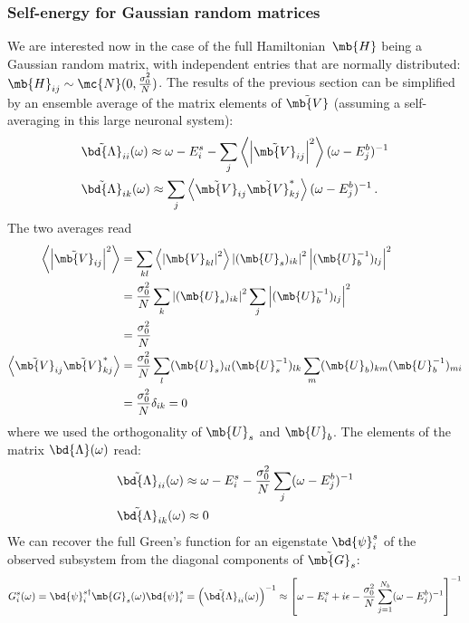 \subsubsection*{Self-energy for Gaussian random matrices}
We are interested now in the case of the full Hamiltonian~$\mb{H}$ being a Gaussian random matrix, with independent entries that are normally distributed: $\mb{H}_{ij}\sim\mc{N}(0, \frac{\sigma_0^2}{N})$.
The results of the previous section can be simplified by an ensemble average of the matrix elements of $\Tilde{\mb{V}}$ (assuming a self-averaging in this large neuronal system):
\begin{align}
    &\Tilde{\bd{\Lambda}}_{ii} (\omega) \approx
    \omega - E^s_i - \sum_j \left< \left| \Tilde{\mb{V}}_{ij} \right|^2 \right> (\omega-E^b_j)^{-1}
    \\
    &
    \Tilde{\bd{\Lambda}}_{ik} (\omega) \approx
    \sum_j \left< \Tilde{\mb{V}}_{ij} \Tilde{\mb{V}}^*_{kj} \right> (\omega-E^b_j)^{-1} \,.
\end{align}
The two averages read
\begin{align}
     \left< \left| \Tilde{\mb{V}}_{ij} \right|^2 \right> & =
    \sum_{kl} \left< \left| \mb{V}_{kl} \right|^2 \right>
    \left| (\mb{U}_s)_{ik} \right|^2
    \left| (\mb{U}_b^{-1})_{lj} \right|^2
    \\
    & =
    \frac{\sigma_0^2}{N}
    \sum_{k}
    \left| (\mb{U}_s)_{ik} \right|^2
    \sum_j
    \left| (\mb{U}_b^{-1})_{lj} \right|^2
    \\
    & =
    \frac{\sigma_0^2}{N}
    \\
    \left< \Tilde{\mb{V}}_{ij} \Tilde{\mb{V}}^*_{kj} \right>
    & =
    \frac{\sigma_0^2}{N}
    \sum_l
    (\mb{U}_s)_{il} (\mb{U}_s^{-1})_{lk}
    \sum_m
    (\mb{U}_b)_{km} (\mb{U}_b^{-1})_{mi}
    \\
    & = \frac{\sigma_0^2}{N} \delta_{ik}
    = 0
\end{align}
where we used the orthogonality of $\mb{U}_s$ and $\mb{U}_b$.
The elements of the matrix $\bd{\Lambda}(\omega)$ read:
\begin{align}
    &\Tilde{\bd{\Lambda}}_{ii} (\omega) \approx
    \omega - E^s_i - \frac{\sigma_0^2}{N} \sum_j (\omega-E^b_j)^{-1}
    \\
    &
    \Tilde{\bd{\Lambda}}_{ik} (\omega) \approx 0
\end{align}
We can recover the full Green's function for an eigenstate $\bd{\psi}_i^s$ of the observed subsystem from the diagonal components of $\tilde{\mb{G}}_s$:
\begin{equation}
    G^s_i(\omega) = \bd{\psi}_i^{s\dagger} \mb{G}_s(\omega) \bd{\psi}^s_i =  \left(\Tilde{\bd{\Lambda}}_{ii} (\omega) \right)^{-1} \approx
    \left[ \omega - E^s_i + i\epsilon - \frac{\sigma_0^2}{N} \sum_{j=1}^{N_b} (\omega-E^b_j)^{-1} \right]^{-1}
    \label{eq:FullGreenFunctionSum}
\end{equation}
